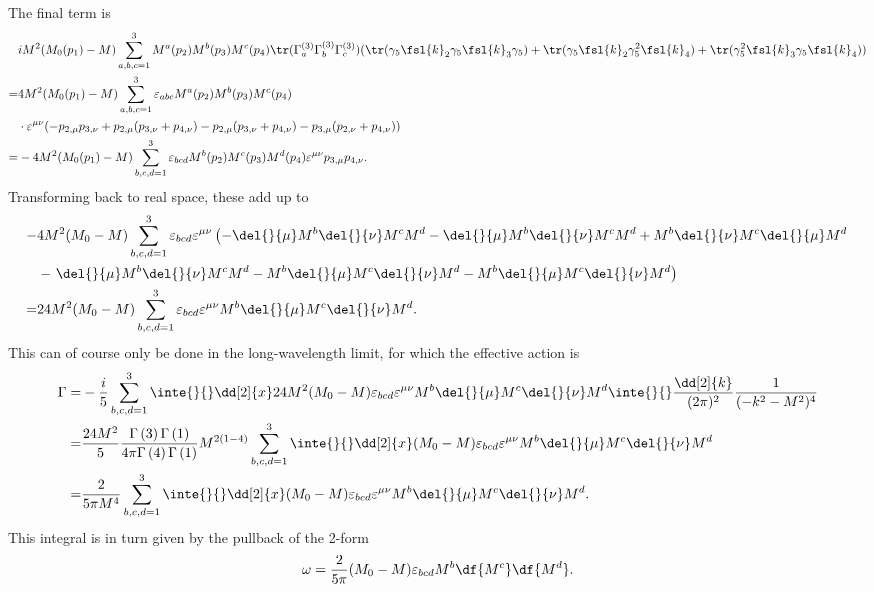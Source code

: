 The final term is
\begin{align*}
	 &iM^{2}(M_{0}(p_{1}) - M)\sum\limits_{a, b, c = 1}^{3}M^{a}(p_{2})M^{b}(p_{3})M^{c}(p_{4})\tr(\Gamma_{a}^{(3)}\Gamma_{b}^{(3)}\Gamma_{c}^{(3)})(\tr(\gamma_{5}\fsl{k}_{2}\gamma_{5}\fsl{k}_{3}\gamma_{5}) + \tr(\gamma_{5}\fsl{k}_{2}\gamma_{5}^{2}\fsl{k}_{4}) + \tr(\gamma_{5}^{2}\fsl{k}_{3}\gamma_{5}\fsl{k}_{4})) \\
	=& 4M^{2}(M_{0}(p_{1}) - M)\sum\limits_{a, b, c = 1}^{3}\varepsilon_{abc}M^{a}(p_{2})M^{b}(p_{3})M^{c}(p_{4}) \\
	 &\cdot\varepsilon^{\mu\nu}(-p_{2, \mu}p_{3, \nu} + p_{2, \mu}(p_{3, \nu} + p_{4, \nu}) - p_{2, \mu}(p_{3, \nu} + p_{4, \nu}) - p_{3, \mu}(p_{2, \nu} + p_{4, \nu})) \\
	=& -4M^{2}(M_{0}(p_{1}) - M)\sum\limits_{b, c, d = 1}^{3}\varepsilon_{bcd}M^{b}(p_{2})M^{c}(p_{3})M^{d}(p_{4})\varepsilon^{\mu\nu}p_{3, \mu}p_{4, \nu}.
\end{align*}
Transforming back to real space, these add up to
\begin{align*}
	-&4M^{2}(M_{0} - M)\sum\limits_{b, c, d = 1}^{3}\varepsilon_{bcd}\varepsilon^{\mu\nu}\left(- \del{}{\mu}M^{b}\del{}{\nu}M^{c}M^{d} - \del{}{\mu}M^{b}\del{}{\nu}M^{c}M^{d} + M^{b}\del{}{\nu}M^{c}\del{}{\mu}M^{d} \right. \\
	 &- \left. \del{}{\mu}M^{b}\del{}{\nu}M^{c}M^{d} - M^{b}\del{}{\mu}M^{c}\del{}{\nu}M^{d} - M^{b}\del{}{\mu}M^{c}\del{}{\nu}M^{d}\right) \\
	=& 24M^{2}(M_{0} - M)\sum\limits_{b, c, d = 1}^{3}\varepsilon_{bcd}\varepsilon^{\mu\nu}M^{b}\del{}{\mu}M^{c}\del{}{\nu}M^{d}.
\end{align*}
This can of course only be done in the long-wavelength limit, for which the effective action is
\begin{align*}
	\Gamma =& -\frac{i}{5}\sum\limits_{b, c, d = 1}^{3}\inte{}{}\dd[2]{x}24M^{2}(M_{0} - M)\varepsilon_{bcd}\varepsilon^{\mu\nu}M^{b}\del{}{\mu}M^{c}\del{}{\nu}M^{d}\inte{}{}\frac{\dd[2]{k}}{(2\pi)^{2}}\frac{1}{(-k^{2} - M^{2})^{4}} \\
	       =& \frac{24M^{2}}{5}\frac{\Gamma\left(3\right)\Gamma\left(1\right)}{4\pi\Gamma\left(4\right)\Gamma\left(1\right)}M^{2(1 - 4)}\sum\limits_{b, c, d = 1}^{3}\inte{}{}\dd[2]{x}(M_{0} - M)\varepsilon_{bcd}\varepsilon^{\mu\nu}M^{b}\del{}{\mu}M^{c}\del{}{\nu}M^{d} \\
	       =& \frac{2}{5\pi M^{4}}\sum\limits_{b, c, d = 1}^{3}\inte{}{}\dd[2]{x}(M_{0} - M)\varepsilon_{bcd}\varepsilon^{\mu\nu}M^{b}\del{}{\mu}M^{c}\del{}{\nu}M^{d}.
\end{align*}
This integral is in turn given by the pullback of the 2-form
\begin{align*}
	\omega = \frac{2}{5\pi}(M_{0} - M)\varepsilon_{bcd}M^{b}\df{M^{c}}\df{M^{d}}.
\end{align*}

